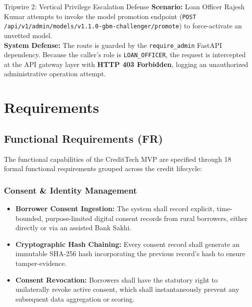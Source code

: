 \documentclass[11pt,a4paper,oneside]{report}
\begin{document}
\begin{tripwirebox}{Tripwire 2: Vertical Privilege Escalation Defense}
\textbf{Scenario:} Loan Officer Rajesh Kumar attempts to invoke the model promotion endpoint (\texttt{POST /api/v1/admin/models/v1.1.0-gbm-challenger/promote}) to force-activate an unvetted model.\\
\textbf{System Defense:} The route is guarded by the \texttt{require\_admin} FastAPI dependency. Because the caller's role is \texttt{LOAN\_OFFICER}, the request is intercepted at the API gateway layer with \textbf{HTTP 403 Forbidden}, logging an unauthorized administrative operation attempt.
\end{tripwirebox}




\chapter{Requirements}
\label{chap:requirements}

\section{Functional Requirements (FR)}
The functional capabilities of the CreditTech MVP are specified through 18 formal functional requirements grouped across the credit lifecycle:

\subsection{Consent \& Identity Management}
\begin{itemize}[leftmargin=2em, label=\textbf{FR-\arabic*.}]
  \item \textbf{Borrower Consent Ingestion:} The system shall record explicit, time-bounded, purpose-limited digital consent records from rural borrowers, either directly or via an assisted Bank Sakhi.
  \item \textbf{Cryptographic Hash Chaining:} Every consent record shall generate an immutable SHA-256 hash incorporating the previous record's hash to ensure tamper-evidence.
  \item \textbf{Consent Revocation:} Borrowers shall have the statutory right to unilaterally revoke active consent, which shall instantaneously prevent any subsequent data aggregation or scoring.
\end{itemize}
\end{document}
